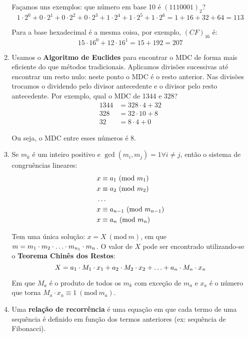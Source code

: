 \documentclass{article}
\newcommand{\Mod}[1]{\ (\mathrm{mod}\ #1)} %
\begin{document}
\begin{enumerate}
	      Façamos uns exemplos: que número em base 10 é \( (1110001)_{2} \)?
	      \[ 1 \cdot 2^0 + 0 \cdot 2^1 + 0 \cdot 2^2 + 0 \cdot 2^3 + 1 \cdot 2^4 + 1 \cdot 2^5 + 1 \cdot 2^6 = 1 + 16 + 32 + 64 = 113 \]

	      Para a base hexadecimal é a mesma coisa, por exemplo, \( (CF)_{16} \) é:
	      \[ 15 \cdot 16^0 + 12 \cdot 16^1 = 15 + 192 = 207 \]

	\item Usamos o \textbf{Algoritmo de Euclides} para encontrar o MDC de forma mais eficiente do que métodos tradicionais. Aplicamos divisões sucessivas até encontrar um resto nulo: neste ponto o MDC é o resto anterior. Nas divisões trocamos o dividendo pelo divisor antecedente e o divisor pelo resto antecedente. Por exemplo, qual o MDC de 1344 e 328?
	      \begin{align*}
		      1344 & = 328 \cdot 4 + 32 \\
		      328  & = 32 \cdot 10  + 8 \\
		      32   & = 8 \cdot 4 + 0
	      \end{align*}

	      Ou seja, o MDC entre esses números é 8.

	\item Se \( m_k \) é um inteiro positivo e \( \gcd (m_i, m_j) = 1 \forall i \neq j \), então o sistema de congruências lineares:
	      \begin{align*}
		       & x \equiv a_{1} \Mod{m_1}       \\
		       & x \equiv a_{2} \Mod{m_2}       \\
		       & \mathellipsis                  \\
		       & x \equiv a_{n-1} \Mod{m_{n-1}} \\
		       & x \equiv a_{n} \Mod{m_{n}}
	      \end{align*}

	      Tem uma única solução: \( x = X \Mod{m} \), em que \( m = m_1 \cdot m_2 \cdot \mathellipsis \cdot m_{n_1} \cdot m_n \). O valor de \( X \) pode ser encontrado utilizando-se o \textbf{Teorema Chinês dos Restos}:
	      \[ X = a_1 \cdot M_1 \cdot x_1 + a_2 \cdot M_2 \cdot x_2 + \mathellipsis + a_n \cdot M_n \cdot x_n \]

	      Em que \( M_a \) é o produto de todos os \( m_k \) com exceção de \( m_a \) e \( x_a \) é o número que torna \( M_a \cdot x_a \equiv 1 \Mod{m_a} \).

	\item Uma \textbf{relação de recorrência} é uma equação em que cada termo de uma sequência é definido em função dos termos anteriores (ex: sequência de Fibonacci).


\end{enumerate}
\end{document}
